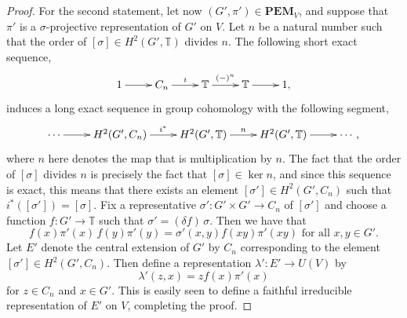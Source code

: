 \documentclass[10pt,a4paper]{amsart}
\newcommand{\PEM}{\mathbf{PEM}}
\newcommand{\bbT}{\mathbb{T}}
\begin{document}
\begin{proof}
    For the second statement, let now $(G',\pi') \in \PEM_V$, and suppose that $\pi'$ is a $\sigma$-projective representation of $G'$ on $V$. Let $n$ be a natural number such that the order of $[\sigma] \in H^2(G',\bbT)$ divides $n$. The following short exact sequence,
    \begin{equation*}
        \xymatrix{
            1 \ar[r] & C_n \ar[r]^-{i} & \bbT \ar[r]^-{(-)^n} & \bbT \ar[r] & 1,
        }
    \end{equation*}
    induces a long exact sequence in group cohomology with the following segment,
    \begin{equation*}
        \xymatrix{
            \cdots \ar[r] & H^2(G',C_n) \ar[r]^-{i^*} & H^2(G',\bbT) \ar[r]^-{n} & H^2(G',\bbT) \ar[r] & \cdots,
        }
    \end{equation*}
    where $n$ here denotes the map that is multiplication by $n$. The fact that the order of $[\sigma]$ divides $n$ is precisely the fact that $[\sigma] \in \ker{n}$, and since this sequence is exact, this means that there exists an element $[\sigma'] \in H^2(G',C_n)$ such that $i^*([\sigma']) = [\sigma]$. Fix a representative $\sigma' \colon G' \times G' \to C_n$ of $[\sigma']$ and choose a function $f \colon G' \to \bbT$ such that $\sigma' = (\delta f) \, \sigma$. Then we have that
    \begin{equation*}
        f(x)\pi'(x) \, f(y)\pi'(y) = \sigma'(x,y) f(xy)\pi'(xy) \text{ for all } x,y \in G'.
    \end{equation*}
    Let $E'$ denote the central extension of $G'$ by $C_n$ corresponding to the element $[\sigma'] \in H^2(G',C_n)$. Then define a representation $\lambda' \colon E' \to U(V)$ by
    \begin{equation*}
        \lambda'(z,x) = z f(x)\pi'(x)
    \end{equation*}
    for $z \in C_n$ and $x \in G'$. This is easily seen to define a faithful irreducible representation of $E'$ on $V$, completing the proof.
\end{proof}
\end{document}
